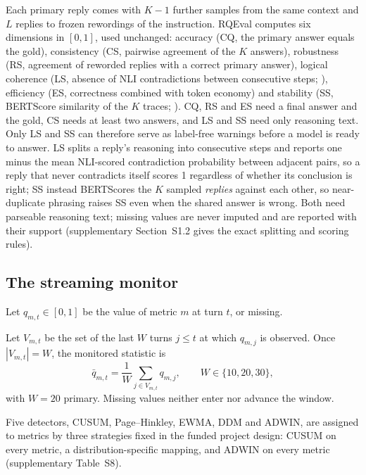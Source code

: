 Each primary reply comes with $K-1$ further samples from the same context and
$L$ replies to frozen rewordings of the instruction. RQEval \citep{rqeval2026}
computes six dimensions in $[0,1]$, used unchanged: accuracy (CQ, the primary
answer equals the gold), consistency (CS, pairwise agreement of the $K$
answers), robustness (RS, agreement of reworded replies with a correct primary
answer), logical coherence (LS, absence of NLI contradictions between
consecutive steps; \citealp{he2021deberta}), efficiency (ES, correctness
combined with token economy) and stability (SS, BERTScore similarity of the $K$
traces; \citealp{zhang2020bertscore}). CQ, RS and ES need a final answer and the
gold, CS needs at least two answers, and LS and SS need only reasoning text.
Only LS and SS can therefore serve as label-free warnings before a model is
ready to answer. LS splits a reply's reasoning into consecutive steps and
reports one minus the mean NLI-scored contradiction probability between
adjacent pairs, so a reply that never contradicts itself scores 1 regardless
of whether its conclusion is right; SS instead BERTScores the $K$ sampled
\emph{replies} against each other, so near-duplicate phrasing raises SS even
when the shared answer is wrong. Both need parseable reasoning text; missing
values are never imputed and are reported with their support (supplementary
Section~S1.2 gives the exact splitting and scoring rules).

\subsection{The streaming monitor}

Let $q_{m,t}\in[0,1]$ be the value of metric $m$ at turn $t$, or missing.

\begin{definition}
Let $V_{m,t}$ be the set of the last $W$ turns $j\le t$ at which $q_{m,j}$ is
observed. Once $|V_{m,t}|=W$, the monitored statistic is
\begin{equation}
  \bar q_{m,t} = \frac{1}{W}\sum_{j\in V_{m,t}} q_{m,j},
  \qquad W\in\{10,20,30\},
  \label{eq:windowmean}
\end{equation}
with $W=20$ primary. Missing values neither enter nor advance the window.
\end{definition}

Five detectors, CUSUM, Page--Hinkley, EWMA, DDM and ADWIN, are assigned to
metrics by three strategies fixed in the funded project design: CUSUM on every
metric, a distribution-specific mapping, and ADWIN on every metric
(supplementary Table~S8).

